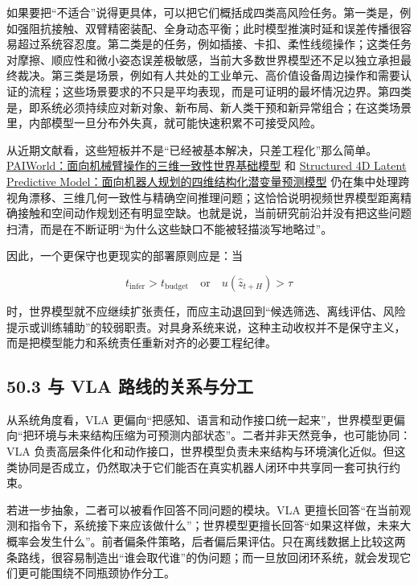 如果要把“不适合”说得更具体，可以把它们概括成四类高风险任务。第一类是\texttt{}，例如强阻抗接触、双臂精密装配、全身动态平衡；此时模型推演时延和误差传播很容易超过系统容忍度。第二类是\texttt{}的任务，例如插接、卡扣、柔性线缆操作；这类任务对摩擦、顺应性和微小姿态误差极敏感，当前大多数世界模型还不足以独立承担最终裁决。第三类是\texttt{}场景，例如有人共处的工业单元、高价值设备周边操作和需要认证的流程；这些场景要求的不只是平均表现，而是可证明的最坏情况边界。第四类是\texttt{}，即系统必须持续应对新对象、新布局、新人类干预和新异常组合；在这类场景里，内部模型一旦分布外失真，就可能快速积累不可接受风险。

从近期文献看，这些短板并不是“已经被基本解决，只差工程化”那么简单。\href{https://arxiv.org/abs/2606.18375}{PAIWorld：面向机械臂操作的三维一致性世界基础模型} 和 \href{https://arxiv.org/abs/2607.01166}{Structured 4D Latent Predictive Model：面向机器人规划的四维结构化潜变量预测模型} 仍在集中处理跨视角漂移、三维几何一致性与精确空间推理问题；这恰恰说明视频世界模型距离精确接触和空间动作规划还有明显空缺。也就是说，当前研究前沿并没有把这些问题扫清，而是在不断证明“为什么这些缺口不能被轻描淡写地略过”。

因此，一个更保守也更现实的部署原则应是：当

\begingroup
\footnotesize
\begin{equation*}
t_{\mathrm{infer}} > t_{\mathrm{budget}}
\quad \text{or} \quad
u(\hat{z}_{t+H}) > \tau
\end{equation*}
\endgroup

时，世界模型就不应继续扩张责任，而应主动退回到“候选筛选、离线评估、风险提示或训练辅助”的较弱职责。对具身系统来说，这种主动收权并不是保守主义，而是把模型能力和系统责任重新对齐的必要工程纪律。

\subsection*{50.3 与 VLA 路线的关系与分工}


从系统角度看，VLA 更偏向“把感知、语言和动作接口统一起来”，世界模型更偏向“把环境与未来结构压缩为可预测内部状态”。二者并非天然竞争，也可能协同：VLA 负责高层条件化和动作接口，世界模型负责未来结构与环境演化近似。但这类协同是否成立，仍然取决于它们能否在真实机器人闭环中共享同一套可执行约束。

若进一步抽象，二者可以被看作回答不同问题的模块。VLA 更擅长回答“在当前观测和指令下，系统接下来应该做什么”；世界模型更擅长回答“如果这样做，未来大概率会发生什么”。前者偏条件策略，后者偏后果评估。只在离线数据上比较这两条路线，很容易制造出“谁会取代谁”的伪问题；而一旦放回闭环系统，就会发现它们更可能围绕不同瓶颈协作分工。

